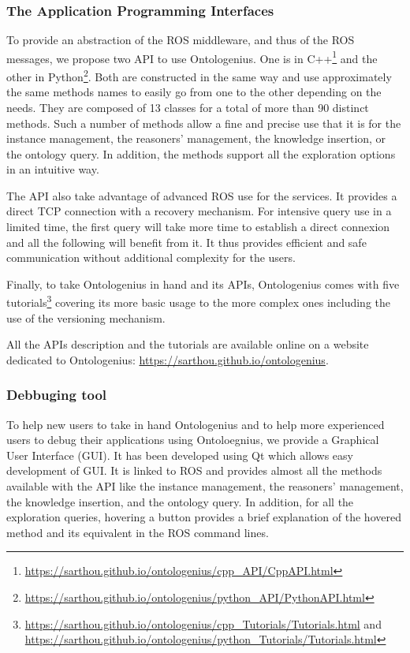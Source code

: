 \subsubsection{The Application Programming Interfaces}

To provide an abstraction of the ROS middleware, and thus of the ROS messages, we propose two API to use Ontologenius. One is in C++\footnote{\url{https://sarthou.github.io/ontologenius/cpp_API/CppAPI.html}} and the other in Python\footnote{\url{https://sarthou.github.io/ontologenius/python_API/PythonAPI.html}}. Both are constructed in the same way and use approximately the same methods names to easily go from one to the other depending on the needs. They are composed of 13 classes for a total of more than 90 distinct methods. Such a number of methods allow a fine and precise use that it is for the instance management, the reasoners' management, the knowledge insertion, or the ontology query. In addition, the methods support all the exploration options in an intuitive way.

The API also take advantage of advanced ROS use for the services. It provides a direct TCP connection with a recovery mechanism. For intensive query use in a limited time, the first query will take more time to establish a direct connexion and all the following will benefit from it. It thus provides efficient and safe communication without additional complexity for the users.

Finally, to take Ontologenius in hand and its APIs, Ontologenius comes with five tutorials\footnote{\url{https://sarthou.github.io/ontologenius/cpp_Tutorials/Tutorials.html} and \url{https://sarthou.github.io/ontologenius/python_Tutorials/Tutorials.html}} covering its more basic usage to the more complex ones including the use of the versioning mechanism.

All the APIs description and the tutorials are available online on a website dedicated to Ontologenius: \url{https://sarthou.github.io/ontologenius}.

\subsubsection{Debbuging tool}

To help new users to take in hand Ontologenius and to help more experienced users to debug their applications using Ontoloegnius, we provide a Graphical User Interface (GUI). It has been developed using Qt which allows easy development of GUI. It is linked to ROS and provides almost all the methods available with the API like the instance management, the reasoners' management, the knowledge insertion, and the ontology query. In addition, for all the exploration queries, hovering a button provides a brief explanation of the hovered method and its equivalent in the ROS command lines.

